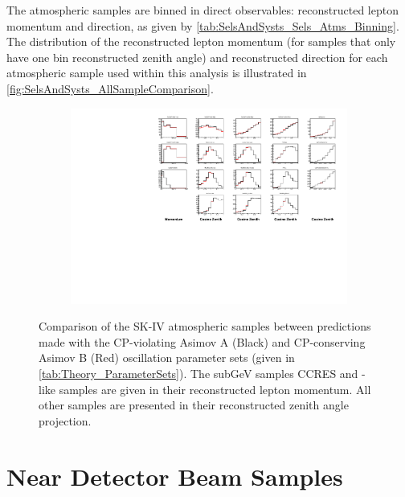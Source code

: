 The atmospheric samples are binned in direct observables: reconstructed lepton momentum and direction, as given by \autoref{tab:SelsAndSysts_Sels_Atms_Binning}. The distribution of the reconstructed lepton momentum (for samples that only have one bin reconstructed zenith angle) and reconstructed direction for each atmospheric sample used within this analysis is illustrated in \autoref{fig:SelsAndSysts_AllSampleComparison}.


\begin{figure}
  \centering
  \begin{subfigure}[t]{\textwidth}
    \includegraphics[width=\textwidth, trim={0mm 0mm 0mm 0mm}, clip,page=1]{Figures/Selections/HistogramComparison.pdf}
  \end{subfigure}
  \caption{Comparison of the SK-IV atmospheric samples between predictions made with the CP-violating Asimov A (Black) and CP-conserving Asimov B (Red) oscillation parameter sets (given in \autoref{tab:Theory_ParameterSets}). The subGeV samples CCRES and -like samples are given in their reconstructed lepton momentum. All other samples are presented in their reconstructed zenith angle projection.}
  \label{fig:SelsAndSysts_AllSampleComparison}
\end{figure}

\clearpage
\section{Near Detector Beam Samples}
\label{sec:SelsAndSysts_Sels_ND}


